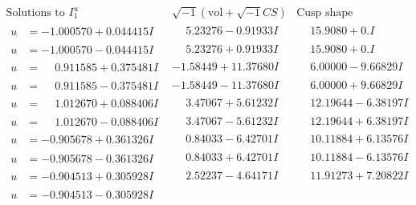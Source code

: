 \documentclass[1p]{elsarticle_modified}
\theoremstyle{definition}
\newcommand{\I}{\sqrt{-1}}
\begin{document}
$$\begin{array}{c|c|c}  
\text{Solutions to }I^u_{1}& \I (\text{vol} + \sqrt{-1}CS) & \text{Cusp shape}\\
 \hline 
\begin{aligned}
u &= -1.000570 + 0.044415 I\end{aligned}
 & \phantom{-}5.23276 - 0.91933 I & \phantom{-}15.9080 + 0. I\phantom{ +0.000000I} \\ \hline\begin{aligned}
u &= -1.000570 - 0.044415 I\end{aligned}
 & \phantom{-}5.23276 + 0.91933 I & \phantom{-}15.9080 + 0. I\phantom{ +0.000000I} \\ \hline\begin{aligned}
u &= \phantom{-}0.911585 + 0.375481 I\end{aligned}
 & -1.58449 + 11.37680 I & \phantom{-}6.00000 - 9.66829 I \\ \hline\begin{aligned}
u &= \phantom{-}0.911585 - 0.375481 I\end{aligned}
 & -1.58449 - 11.37680 I & \phantom{-}6.00000 + 9.66829 I \\ \hline\begin{aligned}
u &= \phantom{-}1.012670 + 0.088406 I\end{aligned}
 & \phantom{-}3.47067 + 5.61232 I & \phantom{-}12.19644 - 6.38197 I \\ \hline\begin{aligned}
u &= \phantom{-}1.012670 - 0.088406 I\end{aligned}
 & \phantom{-}3.47067 - 5.61232 I & \phantom{-}12.19644 + 6.38197 I \\ \hline\begin{aligned}
u &= -0.905678 + 0.361326 I\end{aligned}
 & \phantom{-}0.84033 - 6.42701 I & \phantom{-}10.11884 + 6.13576 I \\ \hline\begin{aligned}
u &= -0.905678 - 0.361326 I\end{aligned}
 & \phantom{-}0.84033 + 6.42701 I & \phantom{-}10.11884 - 6.13576 I \\ \hline\begin{aligned}
u &= -0.904513 + 0.305928 I\end{aligned}
 & \phantom{-}2.52237 - 4.64171 I & \phantom{-}11.91273 + 7.20822 I \\ \hline\begin{aligned}
u &= -0.904513 - 0.305928 I\end{aligned}

\end{array}$$
\end{document}
